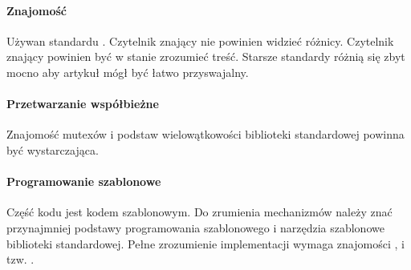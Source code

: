 \paragraph{Znajomość }
Używan standardu . Czytelnik znający  nie powinien widzieć różnicy. Czytelnik znający  powinien być w stanie zrozumieć treść. Starsze standardy różnią się zbyt mocno aby artykuł mógł być łatwo przyswajalny.

\paragraph{Przetwarzanie współbieżne}
Znajomość mutexów i podstaw wielowątkowości biblioteki standardowej \Cpp{} powinna być wystarczająca.

\paragraph{Programowanie szablonowe}
Część kodu jest kodem szablonowym. Do zrumienia mechanizmów należy znać przynajmniej podstawy programowania szablonowego i narzędzia szablonowe biblioteki standardowej. Pełne zrozumienie implementacji wymaga znajomości , i tzw. .
